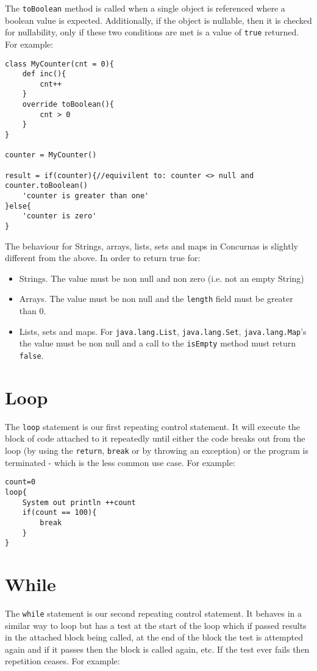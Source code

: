\documentclass[conc-doc]{subfiles}
\begin{document}
The \lstinline{toBoolean} method is called when a single object is referenced where a boolean value is expected. Additionally, if the object is nullable, then it is checked for nullability, only if these two conditions are met is a value of  \lstinline{true} returned. For example:

\begin{lstlisting}
class MyCounter(cnt = 0){
	def inc(){
		cnt++
	}
	override toBoolean(){
		cnt > 0
	}
}

counter = MyCounter()

result = if(counter){//equivilent to: counter <> null and counter.toBoolean()
	'counter is greater than one' 
}else{
	'counter is zero'
}
\end{lstlisting}

The behaviour for Strings, arrays, lists, sets and maps in Concurnas is slightly different from the above. In order to return true for:

\begin{itemize}
	\item Strings. The value must be non null and non zero (i.e. not an empty String)
	\item Arrays. The value must be non null and the \lstinline{length} field must be greater than 0.
	\item Lists, sets and maps. For \lstinline{java.lang.List}, \lstinline{java.lang.Set}, \lstinline{java.lang.Map}'s the value must be non null and a call to the \lstinline{isEmpty} method must return \lstinline{false}.
\end{itemize}

\section{Loop}
The \lstinline{loop} statement is our first repeating control statement. It will execute the block of code attached to it repeatedly until either the code breaks out from the loop (by using the \lstinline{return}, \lstinline{break} or by throwing an exception) or the program is terminated - which is the less common use case. For example:

\begin{lstlisting}
count=0
loop{
	System out println ++count
	if(count == 100){
		break
	}
}
\end{lstlisting}

\section{While}
The \lstinline{while} statement is our second repeating control statement. It behaves in a similar way to loop but has a test at the start of the loop which if passed results in the attached block being called, at the end of the block the test is attempted again and if it passes then the block is called again, etc. If the test ever fails then repetition ceases. For example:
\end{document}
